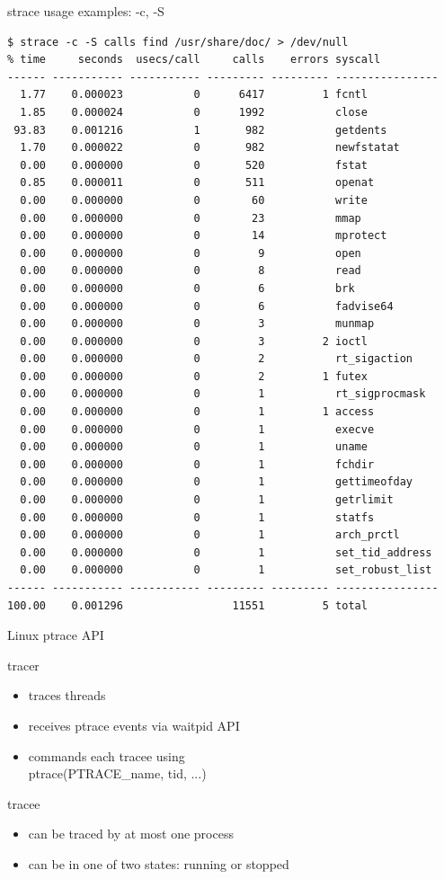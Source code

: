 \documentclass[unicode]{beamer}
\begin{document}
\begin{frame}[fragile]{strace usage examples: -c, -S}
\tiny
\begin{verbatim}
$ strace -c -S calls find /usr/share/doc/ > /dev/null
% time     seconds  usecs/call     calls    errors syscall
------ ----------- ----------- --------- --------- ----------------
  1.77    0.000023           0      6417         1 fcntl
  1.85    0.000024           0      1992           close
 93.83    0.001216           1       982           getdents
  1.70    0.000022           0       982           newfstatat
  0.00    0.000000           0       520           fstat
  0.85    0.000011           0       511           openat
  0.00    0.000000           0        60           write
  0.00    0.000000           0        23           mmap
  0.00    0.000000           0        14           mprotect
  0.00    0.000000           0         9           open
  0.00    0.000000           0         8           read
  0.00    0.000000           0         6           brk
  0.00    0.000000           0         6           fadvise64
  0.00    0.000000           0         3           munmap
  0.00    0.000000           0         3         2 ioctl
  0.00    0.000000           0         2           rt_sigaction
  0.00    0.000000           0         2         1 futex
  0.00    0.000000           0         1           rt_sigprocmask
  0.00    0.000000           0         1         1 access
  0.00    0.000000           0         1           execve
  0.00    0.000000           0         1           uname
  0.00    0.000000           0         1           fchdir
  0.00    0.000000           0         1           gettimeofday
  0.00    0.000000           0         1           getrlimit
  0.00    0.000000           0         1           statfs
  0.00    0.000000           0         1           arch_prctl
  0.00    0.000000           0         1           set_tid_address
  0.00    0.000000           0         1           set_robust_list
------ ----------- ----------- --------- --------- ----------------
100.00    0.001296                 11551         5 total
\end{verbatim}
\end{frame}

\begin{frame}{Linux ptrace API}
	\begin{block}{tracer}
	\begin{itemize}
		\item traces threads
		\item receives ptrace events via waitpid API
		\item commands each tracee using \\ ptrace(PTRACE\_name, tid, ...)
	\end{itemize}
	\end{block}
	\begin{block}{tracee}
	\begin{itemize}
		\item can be traced by at most one process
		\item can be in one of two states: running or stopped
	\end{itemize}
	\end{block}
\end{frame}
\end{document}
